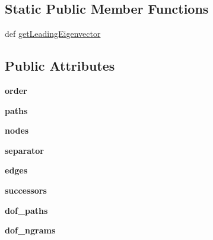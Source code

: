 \subsection*{Static Public Member Functions}
\begin{DoxyCompactItemize}
\item 
def \hyperlink{classpathpy_1_1HigherOrderNetwork_1_1HigherOrderNetwork_a1b757112293f9093efc437ffb113df83}{get\-Leading\-Eigenvector}
\end{DoxyCompactItemize}
\subsection*{Public Attributes}
\begin{DoxyCompactItemize}
\item 
\hypertarget{classpathpy_1_1HigherOrderNetwork_1_1HigherOrderNetwork_a6dea6fe6e34178adb395ad8e79403d5c}{{\bfseries order}}\label{classpathpy_1_1HigherOrderNetwork_1_1HigherOrderNetwork_a6dea6fe6e34178adb395ad8e79403d5c}

\item 
\hypertarget{classpathpy_1_1HigherOrderNetwork_1_1HigherOrderNetwork_ac4c8ee9f7775478793d88680d6f99fc8}{{\bfseries paths}}\label{classpathpy_1_1HigherOrderNetwork_1_1HigherOrderNetwork_ac4c8ee9f7775478793d88680d6f99fc8}

\item 
\hypertarget{classpathpy_1_1HigherOrderNetwork_1_1HigherOrderNetwork_a6626777ff215fde5f7d92368a407c683}{{\bfseries nodes}}\label{classpathpy_1_1HigherOrderNetwork_1_1HigherOrderNetwork_a6626777ff215fde5f7d92368a407c683}

\item 
\hypertarget{classpathpy_1_1HigherOrderNetwork_1_1HigherOrderNetwork_af3e51491a2417e471eeb1404b44df204}{{\bfseries separator}}\label{classpathpy_1_1HigherOrderNetwork_1_1HigherOrderNetwork_af3e51491a2417e471eeb1404b44df204}

\item 
\hypertarget{classpathpy_1_1HigherOrderNetwork_1_1HigherOrderNetwork_a6eec968e72178ab2930f83928b3ca842}{{\bfseries edges}}\label{classpathpy_1_1HigherOrderNetwork_1_1HigherOrderNetwork_a6eec968e72178ab2930f83928b3ca842}

\item 
\hypertarget{classpathpy_1_1HigherOrderNetwork_1_1HigherOrderNetwork_a522350b2e4a401732b64bb0acf1634ea}{{\bfseries successors}}\label{classpathpy_1_1HigherOrderNetwork_1_1HigherOrderNetwork_a522350b2e4a401732b64bb0acf1634ea}

\item 
\hypertarget{classpathpy_1_1HigherOrderNetwork_1_1HigherOrderNetwork_a8a271893d9fb656f805e36335afca257}{{\bfseries dof\-\_\-paths}}\label{classpathpy_1_1HigherOrderNetwork_1_1HigherOrderNetwork_a8a271893d9fb656f805e36335afca257}

\item 
\hypertarget{classpathpy_1_1HigherOrderNetwork_1_1HigherOrderNetwork_a25d69b9cc9b7b328fbd201244e68ca95}{{\bfseries dof\-\_\-ngrams}}\label{classpathpy_1_1HigherOrderNetwork_1_1HigherOrderNetwork_a25d69b9cc9b7b328fbd201244e68ca95}

\end{DoxyCompactItemize}


